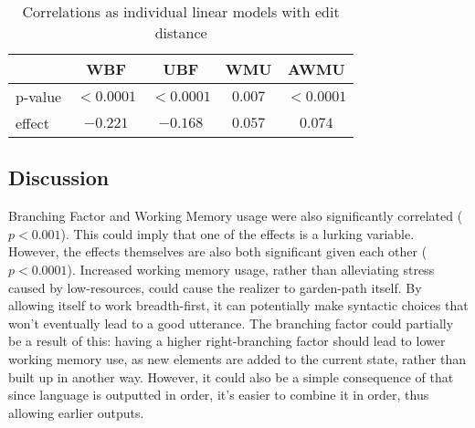 \begin{table}
\centering
\begin{tabular}{l|cccc}
        & WBF & UBF & WMU & AWMU \\ \hline
p-value & $<0.0001$ & $<0.0001$ & $0.007$ & $<0.0001$ \\
effect & $-0.221$ & $-0.168$ & $0.057$ & $0.074$ \\
\end{tabular}
\label{exp1}
\caption{Correlations as individual linear models with edit distance}
\end{table}

\subsection{Discussion}
Branching Factor and Working Memory usage were also significantly correlated ($p<0.001$). This could imply that one of the effects is a lurking variable. However, the effects themselves are also both significant given each other ($p<0.0001$). Increased working memory usage, rather than alleviating stress caused by low-resources, could cause the realizer to garden-path itself. By allowing itself to work breadth-first, it can potentially make syntactic choices that won't eventually lead to a good utterance. The branching factor could partially be a result of this: having a higher right-branching factor should lead to lower working memory use, as new elements are added to the current state, rather than built up in another way. However, it could also be a simple consequence of that since language is outputted in order, it's easier to combine it in order, thus allowing earlier outputs.